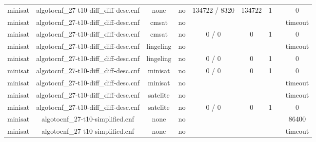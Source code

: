 \begin{appendices}
\begin{table}[p]
\begin{center}
\begin{tabular}{l|cccccccc}
  minisat                        & algotocnf\_27-t10-diff\_diff-desc.cnf & none       & no    & 134722 / 8320 & 134722    & 1         &            & 0 \\ %
  minisat                        & algotocnf\_27-t10-diff\_diff-desc.cnf & cmsat      & no    &            &           &           &            & timeout \\ %
  minisat                        & algotocnf\_27-t10-diff\_diff-desc.cnf & cmsat      & no    & 0 / 0      & 0         & 1         &            & 0 \\ %
  minisat                        & algotocnf\_27-t10-diff\_diff-desc.cnf & lingeling  & no    &            &           &           &            & timeout \\ %
  minisat                        & algotocnf\_27-t10-diff\_diff-desc.cnf & lingeling  & no    & 0 / 0      & 0         & 1         &            & 0 \\ %
  minisat                        & algotocnf\_27-t10-diff\_diff-desc.cnf & minisat    & no    & 0 / 0      & 0         & 1         &            & 0 \\ %
  minisat                        & algotocnf\_27-t10-diff\_diff-desc.cnf & minisat    & no    &            &           &           &            & timeout \\ %
  minisat                        & algotocnf\_27-t10-diff\_diff-desc.cnf & satelite   & no    &            &           &           &            & timeout \\ %
  minisat                        & algotocnf\_27-t10-diff\_diff-desc.cnf & satelite   & no    & 0 / 0      & 0         & 1         &            & 0 \\ %
  minisat                        & algotocnf\_27-t10-simplified.cnf & none       & no    &            &           &           &            & 86400 \\ %
  minisat                        & algotocnf\_27-t10-simplified.cnf & none       & no    &            &           &           &            & timeout \\ %

\end{tabular}
\end{center}
\end{table}
\end{appendices}
